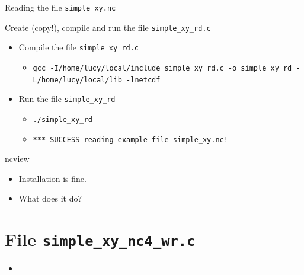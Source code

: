 \documentclass[compress,11pt,xcolor=svgnames,aspectratio=169]{beamer}
\begin{document}
\begin{frame}[fragile]{Reading the file \texttt{simple\_xy.nc}}

Create (copy!), compile and run the file \verb|simple_xy_rd.c|\\[0.4cm]

\begin{itemize}

  \item Compile the file \verb|simple_xy_rd.c|

    \begin{itemize}
      \item \footnotesize{ \verb|gcc -I/home/lucy/local/include simple_xy_rd.c -o simple_xy_rd -L/home/lucy/local/lib -lnetcdf| }\\[0.4cm]
    \end{itemize}

  \item Run the file \verb|simple_xy_rd|

    \begin{itemize}
      \item \verb|./simple_xy_rd|
      \item \verb|*** SUCCESS reading example file simple_xy.nc!|

    \end{itemize}

\end{itemize}

\end{frame}

\begin{frame}[fragile]{ncview}

\begin{itemize}

  \item Installation is fine.
  \item What does it do?

\end{itemize}

\end{frame}

\section{File \texttt{simple\_xy\_nc4\_wr.c}}

\begin{frame}[fragile]{}

\begin{itemize}

  \item

\end{itemize}

\end{frame}
\end{document}
